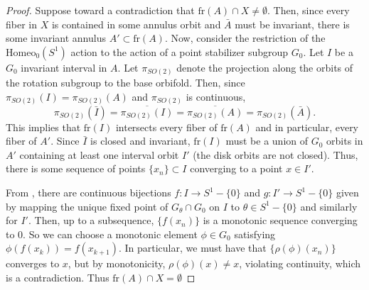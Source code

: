 \documentclass[10pt, oneside]{article}
\newcommand{\homeoS}{\text{Homeo}_0(S^1)}
\theoremstyle{definition}
\theoremstyle{definition}
\begin{document}
\begin{proof}
    Suppose toward a contradiction that $\text{fr}(A)\cap X\neq \emptyset$. Then, since every fiber in $X$ is contained in some annulus orbit and $\bar{A}$ must be invariant, there is some invariant annulus $A'\subset \text{fr}(A)$. Now, consider the restriction of the $\homeoS$ action to the action of a point stabilizer subgroup $G_0$. Let $I$ be a $G_0$ invariant interval in $A$. Let $\pi_{SO(2)}$ denote the projection along the orbits of the rotation subgroup to the base orbifold. Then, since $\pi_{SO(2)}(I) = \pi_{SO(2)}(A)$ and $\pi_{SO(2)}$ is continuous, $$\pi_{SO(2)}(\bar{I}) = \overline{\pi_{SO(2)}(I)} = \overline{\pi_{SO(2)}(A)} = \pi_{SO(2)}(\bar{A}).$$ This implies that $\text{fr}(I)$ intersects every fiber of $\text{fr}(A)$ and in particular, every fiber of $A'$. Since $\bar{I}$ is closed and invariant, $\text{fr}(I)$ must be a union of $G_0$ orbits in $A'$ containing at least one interval orbit $I'$ (the disk orbits are not closed). Thus, there is some sequence of points $\{x_n\}\subset I$ converging to a point $x\in I'$.


    From \cite{mann-chen}, there are continuous bijections $f:I\to S^1-\{0\}$ and $g:I'\to S^1-\{0\}$ given by mapping the unique fixed point of $G_\theta\cap G_0$ on $I$ to $\theta\in S^1 - \{0\}$ and similarly for $I'$. Then, up to a subsequence, $\{f(x_n)\}$ is a monotonic sequence converging to 0. So we can choose a monotonic element $\phi\in G_0$ satisfying $\phi(f(x_k)) = f(x_{k+1})$. In particular, we must have that $\{\rho(\phi)( x_n)\}$ converges to $x$, but by monotonicity, $\rho(\phi)(x) \neq x$, violating continuity, which is a contradiction. Thus $\text{fr}(A)\cap X = \emptyset$
\end{proof}

\listoftodos[Notes]
\end{document}
